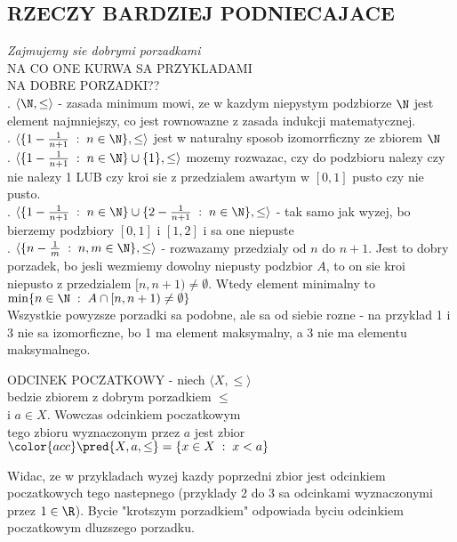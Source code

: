 \documentclass{article}
\begin{document}
\subsection*{RZECZY BARDZIEJ PODNIECAJACE}
    \emph{\color{acc}Zajmujemy sie dobrymi porzadkami}\bigskip\\
    NA CO ONE KURWA SA PRZYKLADAMI\\
    NA DOBRE PORZADKI??\\
    . $\langle \N,\leq\rangle$ - zasada minimum mowi, ze w kazdym niepystym podzbiorze $\N$ jest element najmniejszy, co jest rownowazne z zasada indukcji matematycznej.\medskip\\
    . $\langle\{1-\frac1{n+1}\;:\;n\in\N\}, \leq\rangle$ jest w naturalny sposob izomorrficzny ze zbiorem $\N$\medskip\\
    . $\langle \{1-\frac1{n+1}\;:\; n\in\N\}\cup\{1\},\leq\rangle$ mozemy rozwazac, czy do podzbioru nalezy czy nie nalezy 1 LUB czy kroi sie z przedzialem awartym w $[0,1]$ pusto czy nie pusto.\medskip\\
    . $\langle\{1-{1\over n+1}\;:\;n\in\N\}\cup\{2-{1\over n+1}\;:\;n\in\N\},\leq\rangle$ - tak samo jak wyzej, bo bierzemy podzbiory $[0,1]$ i $[1,2]$ i sa one niepuste\medskip\\
    . $\langle \{n-\frac1m\;:\;n,m\in\N\},\leq\rangle$ - rozwazamy przedzialy od $n$ do $n+1$. Jest to dobry porzadek, bo jesli wezmiemy dowolny niepusty podzbior $A$, to on sie kroi niepusto z przedzialem $[n, n+1)\neq\emptyset$. Wtedy element minimalny to $\min\{n\in\N\;:\; A\cap[n,n+1)\neq\emptyset\}$\bigskip\\
    Wszystkie powyzsze porzadki sa podobne, ale sa od siebie rozne - {\color{acc}na przyklad 1 i 3 nie sa izomorficzne}, bo 1 ma element maksymalny, a 3 nie ma elementu maksymalnego.\bigskip\\
    \bigskip
    \begin{center}\large
        {\color{def}ODCINEK POCZATKOWY }- niech $\langle X,\leq\rangle$ \\
        bedzie zbiorem z dobrym porzadkiem $\leq$ \\
        i $a\in X$. Wowczas odcinkiem poczatkowym\\
        tego zbioru wyznaczonym przez $a$ jest zbior\medskip\\
        $\color{acc}\pred{X,a,\leq} = \{x\in X\;:\;x<a\}$
    \end{center}\bigskip
    Widac, ze w przykladach wyzej kazdy poprzedni zbior jest odcinkiem poczatkowych tego nastepnego (przyklady 2 do 3 sa odcinkami wyznaczonymi przez $1\in\R$). Bycie "krotszym porzadkiem" odpowiada byciu odcinkiem poczatkowym dluzszego porzadku.\bigskip\\
\end{document}
